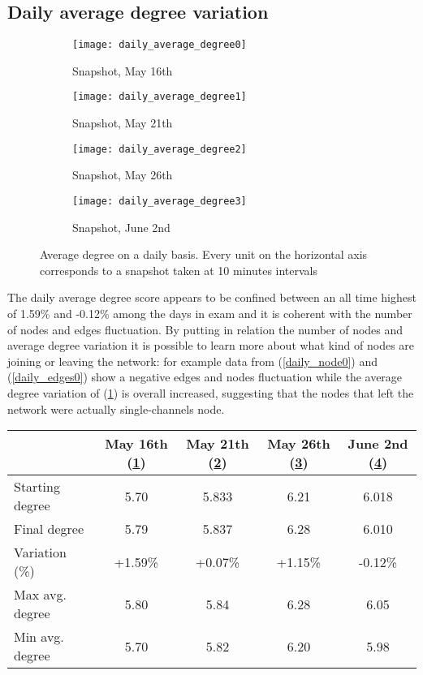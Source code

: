 	\subsection{Daily average degree variation}

	\begin{figure}[h]
	\centering
		\begin{subfigure}{0.45\textwidth}
			\centering
			\texttt{[image: daily\_average\_degree0]}
			\caption{Snapshot, May 16th}
			\label{daily_degree0}
		\end{subfigure}
		\begin{subfigure}{0.45\textwidth}
			\centering
			\texttt{[image: daily\_average\_degree1]}
			\caption{Snapshot, May 21th}
			\label{daily_degree1}
		\end{subfigure}
		\begin{subfigure}{0.45\textwidth}
			\centering
			\texttt{[image: daily\_average\_degree2]}
			\caption{Snapshot, May 26th}
			\label{daily_degree2}
		\end{subfigure}
		\begin{subfigure}{0.45\textwidth}
			\centering
			\texttt{[image: daily\_average\_degree3]}
			\caption{Snapshot, June 2nd}
			\label{daily_degree3}
		\end{subfigure}
	
	\caption{Average degree on a daily basis. Every unit on the horizontal axis corresponds to a snapshot taken at 10 minutes intervals}
	\label{daily_degree _variation}
	\end{figure}

	The daily average degree score appears to be confined between an all time highest of 1.59\% and -0.12\% among the days in exam and it is coherent with the number of nodes and edges fluctuation. By putting in relation the number of nodes and average degree variation it is possible to learn more about what kind of nodes are joining or leaving the network: for example data from (\ref{daily_node0}) and (\ref{daily_edges0}) show a negative edges and nodes fluctuation while the average degree variation of (\ref{daily_degree0}) is overall increased, suggesting that the nodes that left the network were actually single-channels node.


	\begin{center}
		\begin{tabulary}{\linewidth}{| L | C | C | C | C |}
			\hline	
			& May 16th (\ref{daily_degree0}) & May 21th (\ref{daily_degree1}) & May 26th (\ref{daily_degree2}) & June 2nd (\ref{daily_degree3}) \\
			\hline
			Starting degree & 5.70 & 5.833 & 6.21  & 6.018 \\ \hline
			Final degree & 5.79 & 5.837 & 6.28 & 6.010 \\ \hline
			Variation (\%) & +1.59\% & +0.07\% & +1.15\% & -0.12\% \\ \hline
			Max avg. degree & 5.80 & 5.84 & 6.28 & 6.05 \\ \hline
			Min avg. degree & 5.70 & 5.82 & 6.20 & 5.98 \\ \hline		
		\end{tabulary}
	\end{center}
	
